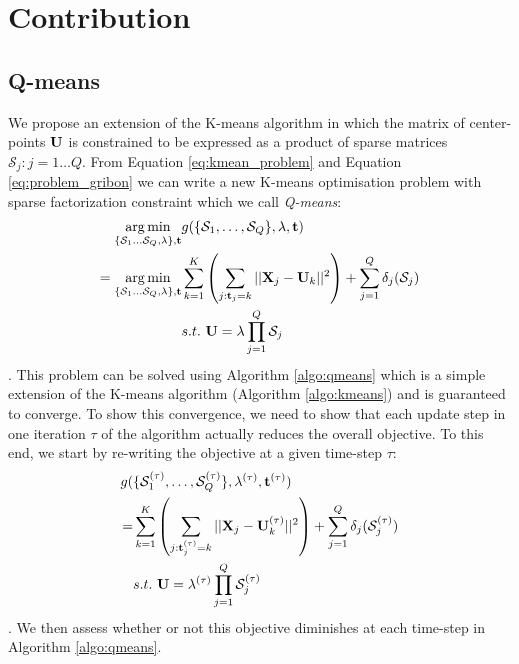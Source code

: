 \section{Contribution}
\label{sec:contribution}
\subsection{Q-means}

We propose an extension of the K-means algorithm in which the matrix of center-points ${\mathbf{U}}$ is constrained to be expressed as a product of sparse matrices $\mathcal{S}_j: j = 1 \ldots Q$. From Equation \ref{eq:kmean_problem} and Equation \ref{eq:problem_gribon} we can write a new K-means optimisation problem with sparse factorization constraint which we call \textit{Q-means}:
%
\begin{equation}
\begin{split}
\label{eq:qmean_problem}
 \operatorname*{arg\,min}_{\{\mathcal{S}_1 \dots \mathcal{S}_Q, \lambda\}, {\mathbf{t}}} & g(\{ \mathcal{S}_1, \ldots,\mathcal{S}_Q \}, \lambda, {\mathbf{t}})\\
    =\operatorname*{arg\,min}_{\{\mathcal{S}_1 \dots \mathcal{S}_Q, \lambda\}, {\mathbf{t}}} & \sum_{k=1}^{K} \left( \sum_{j: {\mathbf{t}}_j = k} ||{\mathbf{X}}_j -{\mathbf{U}}_k||^2 \right) + \sum_{j=1}^{Q} \delta_j(\mathcal{S}_j) \\
    & s.t. ~ {\mathbf{U}} = \lambda \prod_{j=1}^{Q}{\mathcal{S}_j}
\end{split}
\end{equation}.
%
This problem can be solved using Algorithm \ref{algo:qmeans} which is a simple extension of the K-means algorithm (Algorithm \ref{algo:kmeans}) and is guaranteed to converge. To show this convergence, we need to show that each update step in one iteration $\tau$ of the algorithm actually reduces the overall objective. To this end, we start by re-writing the objective at a given time-step $\tau$:
%
\begin{equation}
\begin{split}
\label{eq:qmean_problem_2}
    g(&\{ \mathcal{S}_1^{(\tau)}, \ldots,\mathcal{S}_Q^{(\tau)} \}, \lambda^{(\tau)}, {\mathbf{t}}^{(\tau)})\\
    = & \sum_{k=1}^{K} \left( \sum_{j: {\mathbf{t}}^{(\tau)}_j = k} ||{\mathbf{X}}_j - {\mathbf{U}}^{(\tau)}_k||^2 \right) + \sum_{j=1}^{Q} \delta_j(\mathcal{S}_j^{(\tau)})\\
    & s.t. ~ {\mathbf{U}} = \lambda^{(\tau)} \prod_{j=1}^{Q}{\mathcal{S}_j^{(\tau)}}
\end{split}
\end{equation}.
%
We then assess whether or not this objective diminishes at each time-step in Algorithm \ref{algo:qmeans}.

